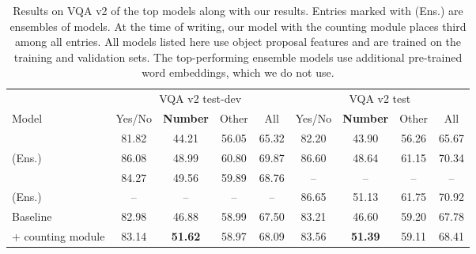 \documentclass[letterpaper]{article}
\begin{document}
\setlength\tabcolsep{3.8pt}
\begin{table}
    \caption{
        Results on VQA v2 of the top models along with our results.
        Entries marked with (Ens.) are ensembles of models.
        At the time of writing, our model with the counting module places third among all entries.
        All models listed here use object proposal features and are trained on the training and validation sets.
        The top-performing ensemble models use additional pre-trained word embeddings, which we do not use.
    }
    \label{tab:vqa-test}
    \centering
    \begin{tabular}{l c c c c c c c c}
        \\
        \toprule
        & \multicolumn{4}{c}{VQA v2 test-dev} & \multicolumn{4}{c}{VQA v2 test}\\
        \cmidrule(l{4pt}){2-5} \cmidrule(l{4pt}){6-9}
        Model & Yes/No & \textbf{Number} & Other & All & Yes/No & \textbf{Number} & Other & All \\
        \hline
        \citet{Teney2017a} & 81.82 & 44.21 & 56.05 & 65.32 & 82.20 & 43.90 & 56.26 & 65.67 \\
        \citet{Teney2017a} (Ens.)& 86.08 & 48.99 & 60.80 & 69.87 & 86.60 & 48.64 & 61.15 & 70.34 \\
        \citet{Zhou2017a} & 84.27 & 49.56 & 59.89 & 68.76 & -- & -- & -- & -- \\
        \citet{Zhou2017a} (Ens.) & -- & -- & -- & -- & 86.65 & 51.13 & 61.75 & 70.92 \\
        \hline
        Baseline & 82.98 & 46.88 & 58.99 & 67.50 & 83.21 & 46.60 & 59.20 & 67.78 \\
        + counting module & 83.14 & \textbf{51.62} & 58.97 & 68.09 & 83.56 & \textbf{51.39} & 59.11 & 68.41 \\
        \bottomrule
    \end{tabular}
\end{table}
\end{document}
